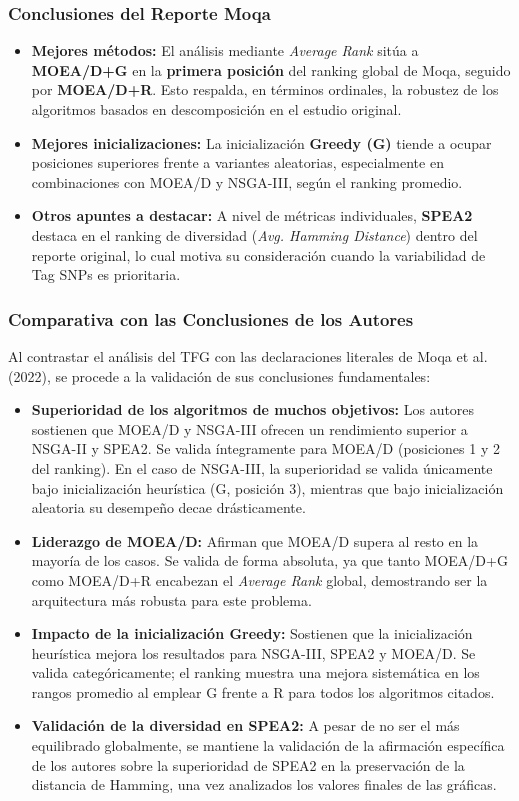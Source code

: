 \documentclass[a4paper,10pt]{article}
\begin{document}
\subsubsection{Conclusiones del Reporte Moqa}
 \begin{itemize}
     \item \textbf{Mejores métodos:} El análisis mediante \textit{Average Rank} sitúa a \textbf{MOEA/D+G} en la \textbf{primera posición} del ranking global de Moqa, seguido por \textbf{MOEA/D+R}. Esto respalda, en términos ordinales, la robustez de los algoritmos basados en descomposición en el estudio original.
     \item \textbf{Mejores inicializaciones:} La inicialización \textbf{Greedy (G)} tiende a ocupar posiciones superiores frente a variantes aleatorias, especialmente en combinaciones con MOEA/D y NSGA-III, según el ranking promedio.
     \item \textbf{Otros apuntes a destacar:} A nivel de métricas individuales, \textbf{SPEA2} destaca en el ranking de diversidad (\textit{Avg. Hamming Distance}) dentro del reporte original, lo cual motiva su consideración cuando la variabilidad de Tag SNPs es prioritaria.
 \end{itemize}

\subsubsection{Comparativa con las Conclusiones de los Autores}
Al contrastar el análisis del TFG con las declaraciones literales de Moqa et al. (2022), se procede a la validación de sus conclusiones fundamentales:

\begin{itemize}
    \item \textbf{Superioridad de los algoritmos de muchos objetivos:} Los autores sostienen que MOEA/D y NSGA-III ofrecen un rendimiento superior a NSGA-II y SPEA2. Se valida íntegramente para MOEA/D (posiciones 1 y 2 del ranking). En el caso de NSGA-III, la superioridad se valida únicamente bajo inicialización heurística (G, posición 3), mientras que bajo inicialización aleatoria su desempeño decae drásticamente.
    \item \textbf{Liderazgo de MOEA/D:} Afirman que MOEA/D supera al resto en la mayoría de los casos. Se valida de forma absoluta, ya que tanto MOEA/D+G como MOEA/D+R encabezan el \textit{Average Rank} global, demostrando ser la arquitectura más robusta para este problema.
    \item \textbf{Impacto de la inicialización Greedy:} Sostienen que la inicialización heurística mejora los resultados para NSGA-III, SPEA2 y MOEA/D. Se valida categóricamente; el ranking muestra una mejora sistemática en los rangos promedio al emplear G frente a R para todos los algoritmos citados.
    \item \textbf{Validación de la diversidad en SPEA2:} A pesar de no ser el más equilibrado globalmente, se mantiene la validación de la afirmación específica de los autores sobre la superioridad de SPEA2 en la preservación de la distancia de Hamming, una vez analizados los valores finales de las gráficas.
\end{itemize}
\end{document}
